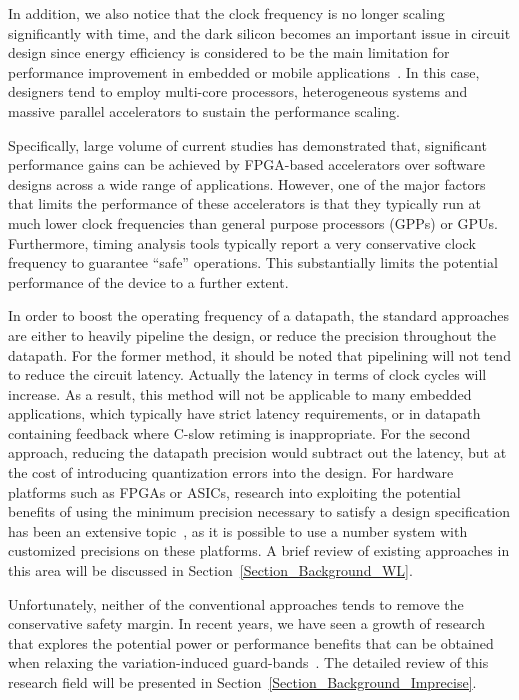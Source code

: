 \documentclass[journal]{IEEEtran}
\begin{document}
In addition, we also notice that the clock frequency is no longer scaling significantly with time, and the dark silicon becomes an important issue in circuit design since energy efficiency is considered to be the main limitation for performance improvement in embedded or mobile applications~\cite{FutureMicroprocessor2005,DarkSilicon2011}. In this case, designers tend to employ multi-core processors, heterogeneous systems and massive parallel accelerators to sustain the performance scaling.

Specifically, large volume of current studies has demonstrated that, significant performance gains can be achieved by FPGA-based accelerators over software designs across a wide range of applications. However, one of the major factors that limits the performance of these accelerators is that they typically run at much lower clock frequencies than general purpose processors (GPPs) or GPUs. Furthermore, timing analysis tools typically report a very conservative clock frequency to guarantee ``safe'' operations. This substantially limits the potential performance of the device to a further extent.

In order to boost the operating frequency of a datapath, the standard approaches are either to heavily pipeline the design, or reduce the precision throughout the datapath. For the former method, it should be noted that pipelining will not tend to reduce the circuit latency. Actually the latency in terms of clock cycles will increase. As a result, this method will not be applicable to many embedded applications, which typically have strict latency requirements, or in datapath containing feedback where C-slow retiming is inappropriate. For the second approach, reducing the datapath precision would subtract out the latency, but at the cost of introducing quantization errors into the design. For hardware platforms such as FPGAs or ASICs, research into exploiting the potential benefits of using the minimum precision necessary to satisfy a design specification has been an extensive topic~\cite{GeorgeDT11}, as it is possible to use a number system with customized precisions on these platforms. A brief review of existing approaches in this area will be discussed in Section~\ref{Section_Background_WL}.

Unfortunately, neither of the conventional approaches tends to remove the conservative safety margin. In recent years, we have seen a growth of research that explores the potential power or performance benefits that can be obtained when relaxing the variation-induced guard-bands~\cite{NewBox2004}. The detailed review of this research field will be presented in Section~\ref{Section_Background_Imprecise}.
\end{document}
